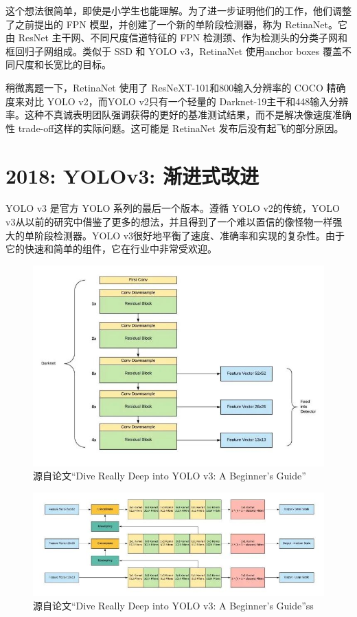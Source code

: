 \documentclass{article}
\begin{document}
	   	这个想法很简单，即使是小学生也能理解。为了进一步证明他们的工作，他们调整了之前提出的 FPN 模型，并创建了一个新的单阶段检测器，称为 RetinaNet。它由 ResNet 主干网、不同尺度信道特征的 FPN 检测颈、作为检测头的分类子网和框回归子网组成。类似于 SSD 和 YOLO v3，RetinaNet 使用anchor boxes 覆盖不同尺度和长宽比的目标。
	   	
	   	稍微离题一下，RetinaNet 使用了 ResNeXT-101和800输入分辨率的 COCO 精确度来对比 YOLO v2，而YOLO v2只有一个轻量的 Darknet-19主干和448输入分辨率。这种不真诚表明团队强调获得的更好的基准测试结果，而不是解决像速度准确性 trade-off这样的实际问题。这可能是 RetinaNet 发布后没有起飞的部分原因。
	   	
	   	
	   	\section{2018: YOLOv3: 渐进式改进} 
	   	
	   YOLO v3 是官方 YOLO 系列的最后一个版本。遵循 YOLO v2的传统，YOLO v3从以前的研究中借鉴了更多的想法，并且得到了一个难以置信的像怪物一样强大的单阶段检测器。YOLO v3很好地平衡了速度、准确率和实现的复杂性。由于它的快速和简单的组件，它在行业中非常受欢迎。
	  
	  \begin{figure}[htpb]
	  	\centering
	  	\includegraphics[width=\linewidth]{detectfig/12.jpg}
	  	\caption{源自论文“Dive Really Deep into YOLO v3: A Beginner’s Guide”}
	  \end{figure}
  \begin{figure}[htpb]
  	\centering
  	\includegraphics[width=\linewidth]{detectfig/13.jpg}
  	\caption{源自论文“Dive Really Deep into YOLO v3: A Beginner’s Guide”ss}
  \end{figure}
	  
\end{document}
